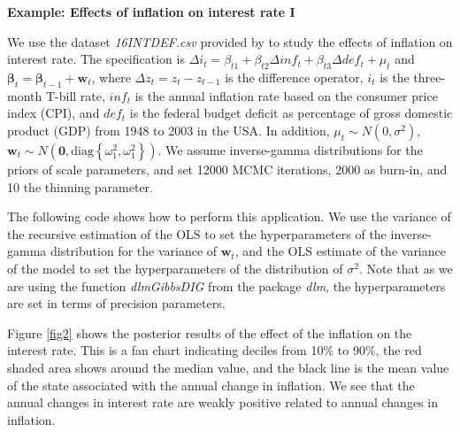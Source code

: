 \textbf{Example: Effects of inflation on interest rate I}

We use the dataset \textit{16INTDEF.csv} provided by \cite[Chaps.~10]{wooldridge2016introductory} to study the effects of inflation on interest rate. The specification is $\Delta i_t=\beta_{t1}+\beta_{t2}\Delta inf_t+\beta_{t3}\Delta def_t+\mu_t$ and $\bm{\beta}_t=\bm{\beta}_{t-1}+\bm{w}_t$, where $\Delta z_t=z_{t}-z_{t-1}$ is the difference operator, $i_t$ is the three-month T-bill rate, $inf_t$ is the annual inflation rate based on the consumer price index (CPI), and $def_t$ is the federal budget deficit as percentage of gross domestic product (GDP) from 1948 to 2003 in the USA. In addition, $\mu_t\sim N(0,\sigma^2)$, $\bm{w}_t\sim N(\bm{0},\text{diag}\left\{\omega_1^2,\omega_1^2\right\})$. We assume inverse-gamma distributions for the priors of scale parameters, and set 12000 MCMC iterations, 2000 as burn-in, and 10 the thinning parameter.

The following code shows how to perform this application. We use the variance of the recursive estimation of the OLS to set the hyperparameters of the inverse-gamma distribution for the variance of $\bm{w}_t$, and the OLS estimate of the variance of the model to set the hyperparameters of the distribution of $\sigma^2$. Note that as we are using the function \textit{dlmGibbsDIG} from the package \textit{dlm}, the hyperparameters are set in terms of precision parameters.

Figure \ref{fig2} shows the posterior results of the effect of the inflation on the interest rate. This is a fan chart indicating deciles from 10\% to 90\%, the red shaded area shows around the median value, and the black line is the mean value of the state associated with the annual change in inflation. We see that the annual changes in interest rate are weakly positive related to annual changes in inflation. 

